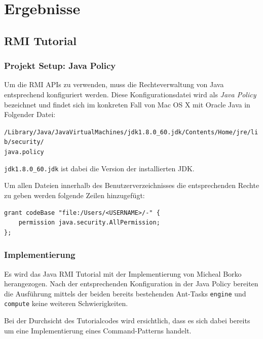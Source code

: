 
\section{Ergebnisse}
\label{sec:Ergebnisse}


\subsection{RMI Tutorial}

\subsubsection{Projekt Setup: Java Policy}
Um die RMI APIs zu verwenden, muss die Rechteverwaltung von Java entsprechend konfiguriert werden.
Diese Konfigurationsdatei wird als \textit{Java Policy} bezeichnet und findet sich im konkreten Fall von Mac OS X mit Oracle Java in Folgender Datei:

\texttt{/Library/Java/JavaVirtualMachines/jdk1.8.0\_60.jdk/Contents/Home/jre/lib/security/\\java.policy}

\texttt{jdk1.8.0\_60.jdk} ist dabei die Version der installierten JDK.

Um allen Dateien innerhalb des Benutzerverzeichnisses die entsprechenden Rechte zu geben werden folgende Zeilen hinzugef\"ugt:

\begin{lstlisting}[caption=\"Anderungen in der Java Policy]
grant codeBase "file:/Users/<USERNAME>/-" {
    permission java.security.AllPermission;
};
\end{lstlisting}

\subsubsection{Implementierung}
Es wird das Java RMI Tutorial\cite{rmi-tutorial} mit der Implementierung von Micheal Borko\cite{rmi-tutorial-impl} herangezogen.
Nach der entsprechenden Konfiguration in der Java Policy bereiten die Ausf\"uhrung mittels der beiden bereits bestehenden Ant-Tasks \texttt{engine} und \texttt{compute} keine weiteren Schwierigkeiten.

Bei der Durchsicht des Tutorialcodes wird ersichtlich, dass es sich dabei bereits um eine Implementierung eines Command-Patterns handelt.

